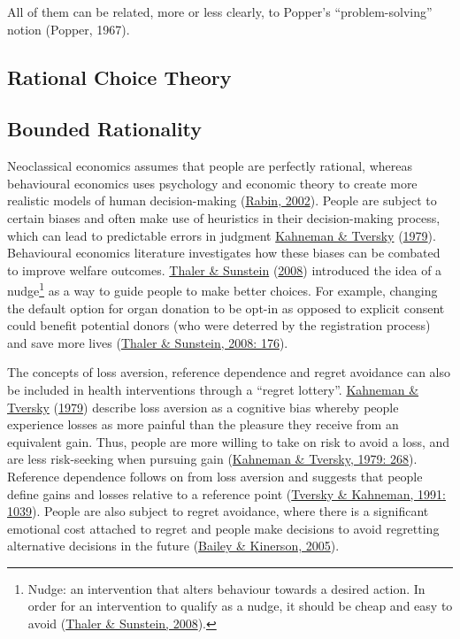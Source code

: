 \documentclass[11pt,preprint, authoryear]{elsarticle}
\numberwithin{equation}{section}
\numberwithin{figure}{section}
\numberwithin{table}{section}
\let\rmarkdownfootnote\footnote%
\def\footnote{\protect\rmarkdownfootnote}
\begin{document}
All of them can be related, more or less clearly, to Popper's
``problem-solving'' notion (Popper, 1967).

\hypertarget{rational-choice-theory}{%
\subsection{Rational Choice Theory}\label{rational-choice-theory}}

\hypertarget{bounded-rationality}{%
\subsection{Bounded Rationality}\label{bounded-rationality}}

Neoclassical economics assumes that people are perfectly rational,
whereas behavioural economics uses psychology and economic theory to
create more realistic models of human decision-making
(\protect\hyperlink{ref-rabin}{Rabin, 2002}). People are subject to
certain biases and often make use of heuristics in their decision-making
process, which can lead to predictable errors in judgment
\protect\hyperlink{ref-prospect}{Kahneman \& Tversky}
(\protect\hyperlink{ref-prospect}{1979}). Behavioural economics
literature investigates how these biases can be combated to improve
welfare outcomes. \protect\hyperlink{ref-nudge}{Thaler \& Sunstein}
(\protect\hyperlink{ref-nudge}{2008}) introduced the idea of a
nudge\footnote{Nudge: an intervention that alters behaviour towards a
  desired action. In order for an intervention to qualify as a nudge, it
  should be cheap and easy to avoid
  (\protect\hyperlink{ref-nudge}{Thaler \& Sunstein, 2008}).} as a way
to guide people to make better choices. For example, changing the
default option for organ donation to be opt-in as opposed to explicit
consent could benefit potential donors (who were deterred by the
registration process) and save more lives
(\protect\hyperlink{ref-nudge}{Thaler \& Sunstein, 2008: 176}).

The concepts of loss aversion, reference dependence and regret avoidance
can also be included in health interventions through a ``regret
lottery''. \protect\hyperlink{ref-prospect}{Kahneman \& Tversky}
(\protect\hyperlink{ref-prospect}{1979}) describe loss aversion as a
cognitive bias whereby people experience losses as more painful than the
pleasure they receive from an equivalent gain. Thus, people are more
willing to take on risk to avoid a loss, and are less risk-seeking when
pursuing gain (\protect\hyperlink{ref-prospect}{Kahneman \& Tversky,
1979: 268}). Reference dependence follows on from loss aversion and
suggests that people define gains and losses relative to a reference
point (\protect\hyperlink{ref-ref}{Tversky \& Kahneman, 1991: 1039}).
People are also subject to regret avoidance, where there is a
significant emotional cost attached to regret and people make decisions
to avoid regretting alternative decisions in the future
(\protect\hyperlink{ref-regret}{Bailey \& Kinerson, 2005}).
\end{document}
